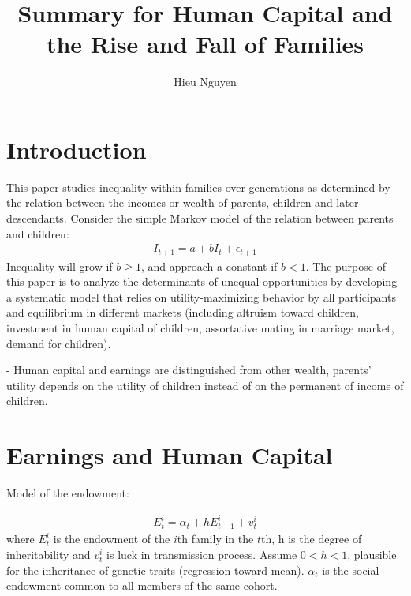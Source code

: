\documentclass[11pt]{article}
\begin{document}
\title{Summary for Human Capital and the Rise and Fall of Families }
\author{Hieu Nguyen}



\maketitle




\section{Introduction}

\indent 
This paper studies inequality within families over generations as determined by the relation between the incomes or wealth of parents, children and later descendants. Consider the simple Markov model of the relation between parents and children:
\begin{align}
I_{t+1} = a + bI_t + \epsilon_{t+1}
\end{align}
Inequality will grow if $b \ge 1$, and approach a constant if $b < 1$. The purpose of this paper is to analyze the determinants of unequal opportunities by developing a systematic model that relies on utility-maximizing behavior by all participants and equilibrium in different markets (including altruism toward children, investment in human capital of children, assortative mating in marriage market, demand for children). 

- Human capital and earnings are distinguished from other wealth, parents' utility depends on the utility of children instead of on the permanent of income of children.

\section{Earnings and Human Capital}
Model of the endowment:

\begin{align}
E_t^i = \alpha_t + hE_{t-1}^i + v_t^i
\end{align}
where $E_t^i$ is the endowment of the $i$th family in the $t$th, h is the degree of inheritability and $v_t^i$ is luck in transmission process. Assume $0 < h <1$, plausible for the inheritance of genetic traits (regression toward mean). $\alpha_t$ is the social endowment common to all members of the same cohort. 
\end{document}
